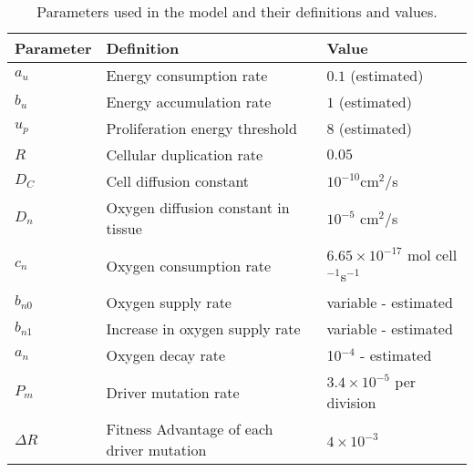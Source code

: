 \documentclass[aps,prl, superscriptaddress,groupedaddress]{revtex4}  %
\begin{document}
	\begin{table}[h]
		\centering
		\caption{  Parameters used in the model and their definitions and values. }
		\setlength{\arrayrulewidth}{0.1mm}
		\setlength{\tabcolsep}{15pt}
		\renewcommand{\arraystretch}{0.8}	
		\begin{tabular}{|p{1.3cm}|p{7cm}|p{4.9cm}|}
			\hline
			Parameter & Definition & Value \\
			\hline 
			$a_u$   & Energy consumption rate & $0.1$ (estimated) \\	
			\hline
			$b_u$   & Energy accumulation rate & $1$ (estimated)\\	
			\hline
			$u_{p}$   & Proliferation energy threshold & $8$  (estimated)\\
			\hline
			$R$   & Cellular duplication rate & $0.05$  \cite{haass2014real} \\	
			\hline
			$D_C$   & Cell  diffusion  constant &  $10^{-10}$cm$^2$/s  \cite{anderson2005hybrid, bray2001cell} \\ 	
			\hline
			$D_n$   &  Oxygen diffusion constant in tissue & $10^{-5}$ cm$^2$/s \cite{anderson2005hybrid} \\  
			\hline
			$c_n$   & Oxygen consumption rate & $6.65\times 10^{-17}$ mol cell$^{-1}$s$^{-1}$ \cite{anderson2005hybrid}    \\ 
			\hline
			$b_{n0}$   & Oxygen supply rate &  variable - estimated    \\ 
			\hline
			$b_{n1}$   & Increase in oxygen supply rate & variable - estimated    \\ 
			\hline
			$a_{n}$   & Oxygen decay rate &  10$^{-4}$ - estimated    \\ 
			\hline
			$P_{m}$   & Driver mutation rate &  $3.4\times 10^{-5}$ per division  \cite{bozic2010accumulation}    \\ 
			\hline
			$\Delta R$ & Fitness Advantage of each driver mutation &  $4\times 10^{-3}$  \cite{bozic2010accumulation}    \\ 
			\hline
		\end{tabular}
	\end{table} 
	
\end{document}
